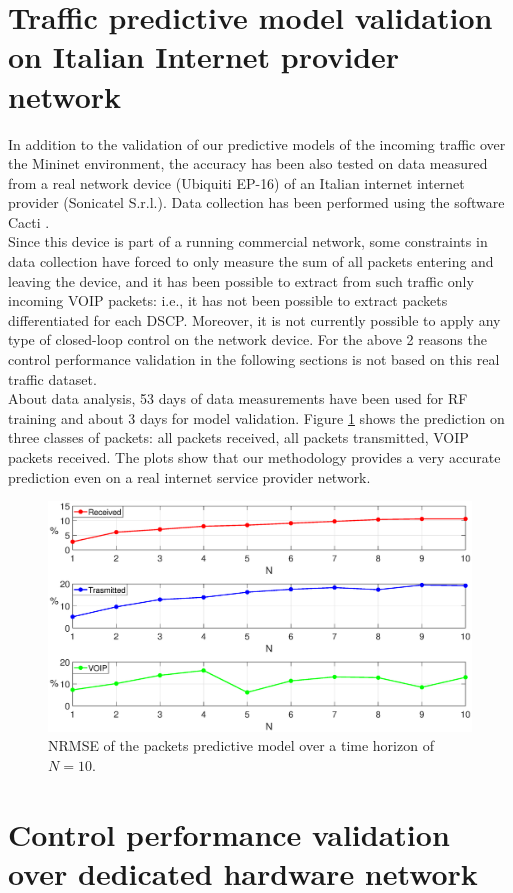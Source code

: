 \section{Traffic predictive model validation on Italian Internet provider network}

{In addition to the validation of our predictive models of the incoming traffic over the Mininet environment, the accuracy has been also tested on data measured from a real network device (Ubiquiti EP-16) of an Italian internet internet provider (Sonicatel S.r.l.). Data collection has been performed using the software Cacti \cite{Cacti}.\\
Since this device is part of a running commercial network, some constraints in data collection have forced to only measure the sum of all packets entering and leaving the device, and it has been possible to extract from such traffic only incoming VOIP packets: i.e., it has not been possible to extract packets differentiated for each DSCP. Moreover, it is not currently possible to apply any type of closed-loop control on the network device. For the above 2 reasons the control performance validation in the following sections is not based on this real traffic dataset.\\
About data analysis, 53 days of data measurements have been used for RF training and about 3 days for model validation. Figure \ref{fig:{errorPescara}} shows the prediction on three classes of packets: all packets received, all packets transmitted, VOIP packets received. The plots show that our methodology provides a very accurate prediction even on a real internet service provider network.}
\begin{figure}[h!]
	\centering
	\includegraphics[trim={120 0 120 0}, width=1\linewidth]{figure/Error_PESCARA_DATA.eps}
	\caption{NRMSE of the packets predictive model over a time horizon of $N=10$.}
	\label{fig:{errorPescara}}
\end{figure}

\section{Control performance validation over dedicated hardware network}